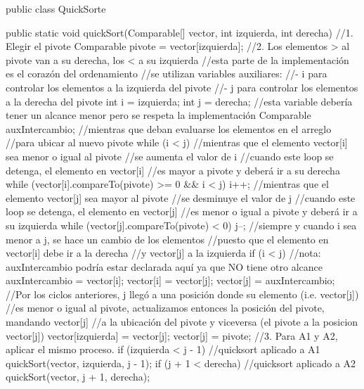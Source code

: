 public class QuickSorte {

    public static void quickSort(Comparable[] vector, int izquierda, int derecha) {
        //1. Elegir el pivote
        Comparable pivote = vector[izquierda];
        //2. Los elementos > al pivote van a su derecha, los < a su izquierda
        //esta parte de la implementación es el corazón del ordenamiento
        //se utilizan variables auxiliares:
        //- i para controlar los elementos a la izquierda del pivote
        //- j para controlar los elementos a la derecha del pivote
        int i = izquierda;
        int j = derecha;
        //esta variable debería tener un alcance menor pero se respeta la implementación
        Comparable auxIntercambio;
        //mientras que deban evaluarse los elementos en el arreglo
        //para ubicar al nuevo pivote
        while (i < j) {
            //mientras que el elemento vector[i] sea menor o igual al pivote
            //se aumenta el valor de i
            //cuando este loop se detenga, el elemento en vector[i]
            //es mayor a pivote y deberá ir a su derecha
            while (vector[i].compareTo(pivote) >= 0 && i < j) {
                i++;
            }
            //mientras que el elemento vector[j] sea mayor al pivote
            //se desminuye el valor de j
            //cuando este loop se detenga, el elemento en vector[j]
            //es menor o igual a pivote y deberá ir a su izquierda
            while (vector[j].compareTo(pivote) < 0) {
                j--;
            }
            //siempre y cuando i sea menor a j, se hace un cambio de los elementos
            //puesto que el elemento en vector[i] debe ir a la derecha
            //y vector[j] a la izquierda
            if (i < j) {
                //nota: auxIntercambio podría estar declarada aquí ya que NO tiene otro alcance
                auxIntercambio = vector[i];
                vector[i] = vector[j];
                vector[j] = auxIntercambio;
            }
        }
        //Por los ciclos anteriores, j llegó a una posición donde su elemento (i.e. vector[j])
        //es menor o igual al pivote, actualizamos entonces la posición del pivote, mandando vector[j]
        //a la ubicación del pivote y viceversa (el pivote a la posicion vector[j])
        vector[izquierda] = vector[j];
        vector[j] = pivote;
        //3. Para A1 y A2, aplicar el mismo proceso.
        if (izquierda < j - 1) {
            //quicksort aplicado a A1
            quickSort(vector, izquierda, j - 1);
        }
        if (j + 1 < derecha) {
            //quicksort aplicado a A2
            quickSort(vector, j + 1, derecha);
        }
    }
}
